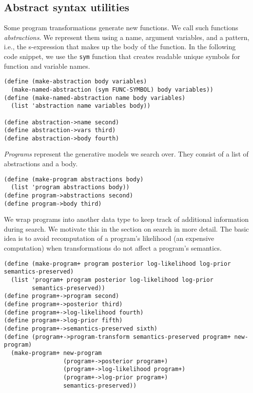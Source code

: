 \documentclass[a4paper,10pt]{article}
\begin{document}
\subsection{Abstract syntax utilities}
Some program transformations generate new functions. We call such functions {\em abstractions}. We represent them using a name, argument variables, and a pattern, i.e., the s-expression that makes up the body of the function. In the following code snippet, we use the \texttt{sym} function that creates readable unique symbols for function and variable names.
\begin{lstlisting}[frame=trBL]
(define (make-abstraction body variables)
  (make-named-abstraction (sym FUNC-SYMBOL) body variables))
(define (make-named-abstraction name body variables)
  (list 'abstraction name variables body))

(define abstraction->name second)
(define abstraction->vars third)
(define abstraction->body fourth)
\end{lstlisting}

{\em Programs} represent the generative models we search over. They consist of a list of abstractions and a body.
\begin{lstlisting}[frame=trBL]
(define (make-program abstractions body)
  (list 'program abstractions body))
(define program->abstractions second)
(define program->body third)
\end{lstlisting}  

We wrap programs into another data type to keep track of additional information during search. We motivate this in the section on search in more detail. The basic idea is to avoid recomputation of a program's likelihood (an expensive computation) when transformations do not affect a program's semantics.
\begin{lstlisting}[frame=trBL]
(define (make-program+ program posterior log-likelihood log-prior semantics-preserved)
  (list 'program+ program posterior log-likelihood log-prior 
        semantics-preserved))
(define program+->program second)
(define program+->posterior third)
(define program+->log-likelihood fourth)
(define program+->log-prior fifth)
(define program+->semantics-preserved sixth)
(define (program+->program-transform semantics-preserved program+ new-program)
  (make-program+ new-program 
                 (program+->posterior program+) 
                 (program+->log-likelihood program+) 
                 (program+->log-prior program+) 
                 semantics-preserved))
\end{lstlisting}
\end{document}
